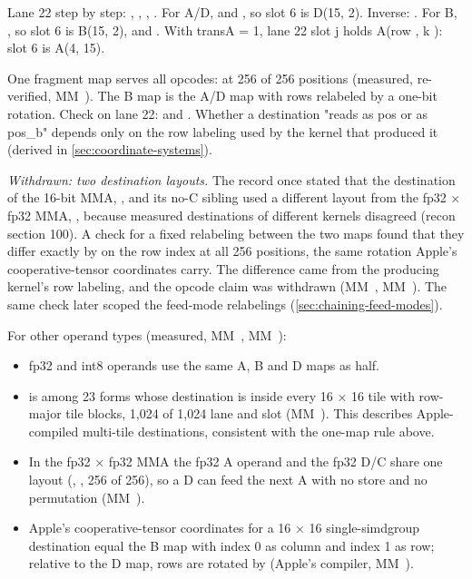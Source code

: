 Lane 22 step by step: , , , . For A/D, 
and , so slot 6 is D(15, 2). Inverse: . For B, , so slot 6 is B(15, 2), and . With transA = 1, lane 22 slot j holds A(row , k ): slot 6 is
A(4, 15).

One fragment map serves all opcodes:  at 256 of 256 positions (measured,
re-verified, MM~). The B map is the A/D map with rows relabeled by a one-bit rotation. Check on lane 22:  and . Whether a destination "reads as pos or as pos\_b" depends only on the
row labeling used by the kernel that produced it (derived in \cref{sec:coordinate-systems}).

\emph{Withdrawn: two destination layouts.} The record once stated that the destination of the 16-bit MMA, , and its no-C sibling used a different layout from the fp32 × fp32 MMA, ,
because measured destinations of different kernels disagreed (recon section 100). A check for a fixed relabeling
between the two maps found that they differ exactly by  on the row index at all 256 positions, the same
rotation Apple's cooperative-tensor coordinates carry. The difference came from the producing kernel's row labeling,
and the opcode claim was withdrawn (MM~, MM~). The same check later scoped the feed-mode
relabelings (\cref{sec:chaining-feed-modes}).

For other operand types (measured, MM~, MM~):

\begin{itemize}
\item fp32 and int8 operands use the same A, B and D maps as half.
\item {} is among 23 forms whose destination is  inside every 16 × 16
  tile with row-major tile blocks, 1,024 of 1,024 lane and slot (MM~). This describes Apple-compiled multi-tile
  destinations, consistent with the one-map rule above.
\item In the fp32 × fp32 MMA the fp32 A operand and the fp32 D/C share one layout (, , 256 of 256), so a D
  can feed the next A with no store and no permutation (MM~).
\item Apple's cooperative-tensor coordinates for a 16 × 16 single-simdgroup destination equal the B map with index 0 as
  column and index 1 as row; relative to the D map, rows are rotated by  (Apple's compiler,
  MM~).
\end{itemize}

